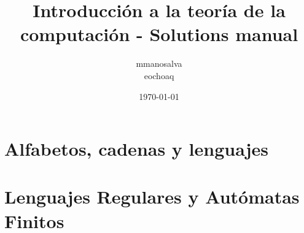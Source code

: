 \documentclass[12pt,a4paper]{report}
\title{Introducción a la teoría de la computación - Solutions manual}
\author{mmanosalva\\eochoaq}
\date{\today}
\begin{document}
\maketitle
\tableofcontents
\cleardoublepage

\chapter{Alfabetos, cadenas y lenguajes}

\chapter{Lenguajes Regulares y Autómatas Finitos}

\end{document}

